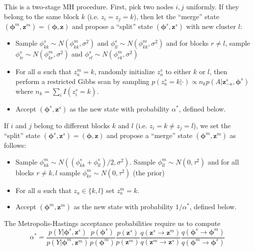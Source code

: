 \documentclass{article}
\begin{document}
This is a two-stage MH procedure.  First, pick two nodes $i,j$ uniformly.  If they belong to the same block $k$ (i.e. $z_i=z_j=k$), then let the ``merge'' state $(\boldsymbol{\phi}^{m},\mathbf{z}^{m}) = (\boldsymbol{\phi},\mathbf{z})$ and propose a ``split'' state $(\boldsymbol{\phi}^{s},\mathbf{z}^{s})$ with new cluster $l$:
\begin{itemize}
\item Sample $\phi_{kk}^{s} \sim N(\phi_{kk}^{m},\sigma^2)$ and $\phi_{ll}^{s} \sim N(\phi_{kk}^{m},\sigma^2)$ and for blocks $r \ne l$, sample $\phi_{lr}^{s} \sim N(\phi_{kr}^{m},\sigma^2)$ and $\phi_{rl}^{s} \sim N(\phi_{rk}^{m},\sigma^2)$ 
\item For all $a$ such that $z_a^{m} = k$, randomly initialize $z_a^{s}$ to either $k$ or $l$, then perform a restricted Gibbs scan by sampling $p(z_{a}^{s}=k|\cdot)  \propto n_k p(A|\mathbf{z}^{s}_{-a},\boldsymbol{\phi}^{s})$
where $n_k=\sum_{i}I(z_i^{s}=k)$.%
\item Accept  $(\boldsymbol{\phi}^{s},\mathbf{z}^{s})$ as the new state with probability $\alpha^*$, defined below.
\end{itemize}

 If $i$ and $j$ belong to different blocks $k$ and $l$ (i.e. $z_i = k \ne z_j=l$), we set the ``split'' state  $(\boldsymbol{\phi}^{s},\mathbf{z}^{s}) = (\boldsymbol{\phi},\mathbf{z})$ and propose a ``merge'' state $(\boldsymbol{\phi}^{m},\mathbf{z}^{m})$ as follows:
\begin{itemize}
\item Sample $\phi_{kk}^m \sim N((\phi_{kk}^s + \phi_{ll}^s)/2,
  \sigma^2)$.  Sample $\phi_{ll}^m \sim N(0,\tau^2)$ and for all blocks $r \ne k,l$ sample $\phi_{kr}^{m} \sim N(0,\tau^2)$ (the prior)
\item For all $a$ such that $z_a \in \{k,l\}$ set $z_a^m = k$.
\item Accept $(\boldsymbol{\phi}^{m},\mathbf{z}^{m})$ as the new state with probability $1/\alpha^*$, defined below.
\end{itemize}

 The Metropolis-Hastings acceptance probabilities require us to compute 
$$\alpha^* =\frac{p(Y|\boldsymbol{\phi}^{s},\mathbf{z}^{s})}{p(Y|\boldsymbol{\phi}^{m},\mathbf{z}^{m})}  \frac{p(\boldsymbol{\phi}^{s})}{p(\boldsymbol{\phi}^{m})} \frac{p(\mathbf{z}^{s})}{p(\mathbf{z}^{m})} \frac{q(\mathbf{z}^{s} \rightarrow \mathbf{z}^{m})}{q( \mathbf{z}^{m} \rightarrow \mathbf{z}^{s})} \frac{q(\boldsymbol{\phi}^{s} \rightarrow \boldsymbol{\phi}^{m})}{q(\boldsymbol{\phi}^{m} \rightarrow \boldsymbol{\phi}^{s})}$$
\end{document}
